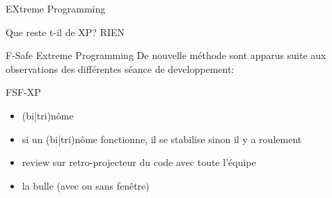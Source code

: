 \begin{frame}{EXtreme Programming}
  \begin{alertblock}{Que reste t-il de XP?}
    RIEN
  \end{alertblock}
\end{frame}


\begin{frame}{F-Safe Extreme Programming}
  De nouvelle méthode sont apparus suite aux observations des différentes séance de developpement:
  \begin{exampleblock}{FSF-XP}
    \begin{itemize}
    \item (bi|tri)nôme
    \item si un (bi|tri)nôme fonctionne, il se stabilise sinon il y a roulement
    \item review sur retro-projecteur du code avec toute l'équipe
    \item la bulle (avec ou sans fenêtre)
    \end{itemize}
  \end{exampleblock}
\end{frame}

